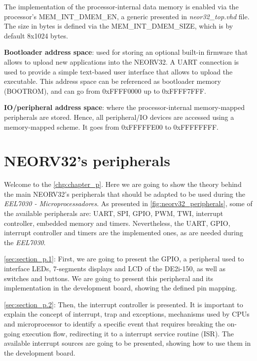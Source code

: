         \begin{tcolorbox}[colback=blue!5!white,colframe=blue!75!black,title=Extra information]
            The implementation of the processor-internal data memory is enabled via the processor's MEM\_INT\_DMEM\_EN, a generic presented in \textit{neor32\_top.vhd} file. The size in bytes is defined via the MEM\_INT\_DMEM\_SIZE, which is by default 8x1024 bytes.
        \end{tcolorbox}

    \textbf{Bootloader address space}: used for storing an optional built-in firmware that allows to upload new applications into the NEORV32. A UART connection is used to provide a simple text-based user interface that allows to upload the executable. This address space can be referenced as bootloader memory (BOOTROM), and can go from 0xFFFF0000 up to 0xFFFF7FFF.

    \textbf{IO/peripheral address space}: where the processor-internal memory-mapped peripherals are stored. Hence, all peripheral/IO devices are accessed using a memory-mapped scheme. It goes from 0xFFFFFE00 to 0xFFFFFFFF.


\chapter{NEORV32's peripherals}\label{chp:chapter_p}
 
    Welcome to the \autoref{chp:chapter_p}. Here we are going to show the theory behind the main NEORV32's peripherals that should be adapted to be used during the \textit{EEL7030 - Microprocessadores}. As presented in \autoref{fig:neorv32_peripherals}, some of the available peripherals are: UART, SPI, GPIO, PWM, TWI, interrupt controller, embedded memory and timers. Nevertheless, the UART, GPIO, interrupt controller and timers are the implemented ones, as are needed during the \textit{EEL7030}.

    \autoref{sec:section_p.1}: First, we are going to present the GPIO, a peripheral used to interface LEDs, 7-segments displays and LCD of the DE2i-150, as well as switches and buttons. We are going to present this peripheral and its implementation in the development board, showing the defined pin mapping. 
    
    \autoref{sec:section_p.2}: Then, the interrupt controller is presented. It is important to explain the concept of interrupt, trap and exceptions, mechanisms used by CPUs and microprocessor to identify a specific event that requires breaking the on-going execution flow, redirecting it to a interrupt service routine (ISR). The available interrupt sources are going to be presented, showing how to use them in the development board. 
    
